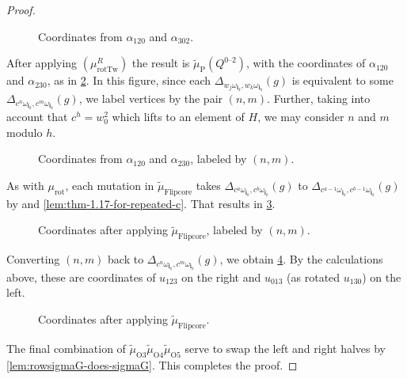 \documentclass{amsart}
\theoremstyle{plain}
\theoremstyle{definition}
\theoremstyle{remark}
\newcommand{\Qdv}{Q^{0\text{--}2}}
\newcommand{\fundamentalweight}{\omega}
\newcommand{\genminoryz}[3]{\Delta_{{#1} \fundamentalweight_{#3}, {#2}%
    \fundamentalweight_{#3}}}
\newcommand{\word}[1]{\mathbf{#1}}
\newcommand{\murot}{{\mu_{\text{rot}}}}
\newcommand{\murottwistR}{{\mu^{R}_{\text{rotTw}}}}
\newcommand{\muint}[1]{\widetilde{\mu}_{\text{#1}}}
\newcommand{\muflipcore}{\muint{Flipcore}}
\newcommand{\muP}{\muint{P}}
\begin{document}
\begin{proof}
    \begin{figure}
      \centering 

      \caption{Coordinates from $\alpha_{120}$ and $\alpha_{302}$.
        \label{fig:flip-C3-120-302}
      }
    \end{figure}

    After applying $\left( \murottwistR \right)$ the result is
    $\muP(\Qdv)$, with the coordinates of $\alpha_{120}$ and
    $\alpha_{230}$, as in \cref{fig:flip-C3-120-230}. In this figure,
    since each $\genminoryz{w_j}{w_k}{\word{i}_k}(g)$ is equivalent to
    some $\genminoryz{c^n}{c^m}{\word{i}_k}(g)$, we label vertices by
    the pair $(n,m)$. Further, taking into account that $c^{h} = w_0^2$
    which lifts to an element of $H$, we may consider $n$ and $m$ modulo
    $h$.

    \begin{figure}
      \centering 

      \caption{Coordinates from $\alpha_{120}$ and $\alpha_{230}$,
        labeled by $(n,m)$.
        \label{fig:flip-C3-120-230}
      }
    \end{figure}

    As with $\murot$, each mutation in $\muflipcore$ takes
    $\genminoryz{c^a}{c^b}{\word{i}_k}(g)$ to
    $\genminoryz{c^{a-1}}{c^{b-1}}{\word{i}_k}(g)$ by
    \cite[Theorem~1.17]{fominzelevinsky1999} and
    \cref{lem:thm-1.17-for-repeated-c}. That results in
    \cref{fig:flip-C3-120-230-post-flipcore}.

    \begin{figure}
      \centering 

      \caption{Coordinates after applying $\muflipcore$, labeled by
        $(n,m)$.
        \label{fig:flip-C3-120-230-post-flipcore}
      }
    \end{figure}

    Converting $(n,m)$ back to $\genminoryz{c^n}{c^m}{\word{i}_k}(g)$,
    we obtain \cref{fig:flip-C3-123-013}. By the calculations above,
    these are coordinates of $u_{123}$ on the right and $u_{013}$ (as
    rotated $u_{130}$) on the left.

    \begin{figure}
      \centering 

      \caption{Coordinates after applying $\muflipcore$.
        \label{fig:flip-C3-123-013}
      }
    \end{figure}

    The final combination of $\muint{O3} \muint{O4} \muint{O5}$ serve to
    swap the left and right halves by \cref{lem:rowsigmaG-does-sigmaG}.
    This completes the proof.
  \end{proof}
\end{document}
